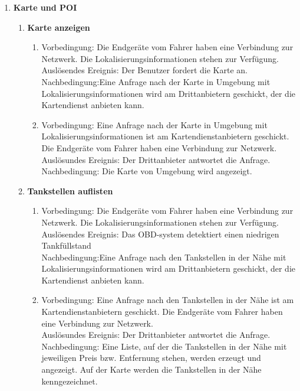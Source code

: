 \documentclass[pflichtenheft.tex]{subfiles}
\begin{document}
\begin{enumerate}
\begin{enumerate}
	\end{enumerate}
	
	
	\item{\textbf{Karte und POI}}
	
	\begin{enumerate}
	
	\item{\textbf{Karte anzeigen}}
	\begin{enumerate}
		\item 
		Vorbedingung: Die Endgeräte vom Fahrer haben eine Verbindung zur Netzwerk. Die
		Lokalisierungsinformationen stehen zur Verfügung.
		\\Auslösendes Ereignis: Der Benutzer fordert die Karte an.
	 	\\Nachbedingung:Eine Anfrage nach der Karte in Umgebung mit
	 	Lokalisierungsinformationen wird am Drittanbietern geschickt, der die
	 	Kartendienst anbieten kann.
	 	\item
		Vorbedingung: Eine Anfrage nach der Karte in Umgebung mit
		Lokalisierungsinformationen ist am Kartendienstanbietern geschickt. Die
		Endgeräte vom Fahrer haben eine Verbindung zur Netzwerk.
		\\Auslösundes Ereignis: Der Drittanbieter antwortet die Anfrage.
		\\Nachbedingung: Die Karte von Umgebung wird angezeigt.
  	\end{enumerate}
  	
  	\item {\textbf{Tankstellen auflisten}}
  	\begin{enumerate} 
  		\item 
		Vorbedingung: Die Endgeräte vom Fahrer haben eine Verbindung zur Netzwerk. Die
		Lokalisierungsinformationen stehen zur Verfügung.
		\\Auslösendes Ereignis: Das OBD-system detektiert einen niedrigen
		Tankfüllstand
		\\Nachbedingung:Eine Anfrage nach den Tankstellen in der Nähe mit
	 	Lokalisierungsinformationen wird am Drittanbietern geschickt, der die
	 	Kartendienst anbieten kann.
	 	\item
		Vorbedingung: Eine Anfrage nach den Tankstellen in der Nähe ist am
		Kartendienstanbietern geschickt. Die Endgeräte vom Fahrer haben eine
		Verbindung zur Netzwerk.
		\\Auslösundes Ereignis: Der Drittanbieter antwortet die Anfrage.
		\\Nachbedingung: Eine Liste, auf der die Tankstellen in der Nähe mit
		jeweiligen Preis bzw. Entfernung stehen, werden erzeugt und angezeigt. Auf der
		Karte werden die Tankstellen in der Nähe kenngezeichnet.
  	\end{enumerate}
  	

\end{enumerate}
\end{enumerate}
\end{document}
